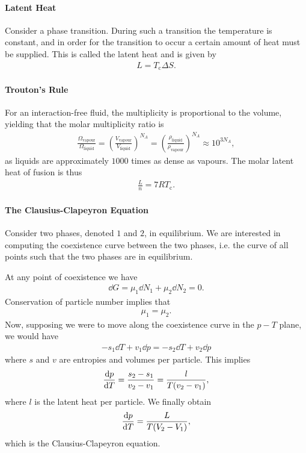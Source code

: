 \paragraph{Latent Heat}
Consider a phase transition. During such a transition the temperature is constant, and in order for the transition to occur a certain amount of heat must be supplied. This is called the latent heat and is given by
\begin{align*}
	L = T_{\text{c}}\Delta S.
\end{align*}

\paragraph{Trouton's Rule}
For an interaction-free fluid, the multiplicity is proportional to the volume, yielding that the molar multiplicity ratio is
\begin{align*}
	\frac{\Omega_{\text{vapour}}}{\Omega_{\text{liquid}}} = \left(\frac{V_{\text{vapour}}}{V_{\text{liquid}}}\right)^{N_{A}} = \left(\frac{\rho_{\text{liquid}}}{\rho_{\text{vapour}}}\right)^{N_{A}} \approx 10^{3N_{A}},
\end{align*}
as liquids are approximately $1000$ times as dense as vapours. The molar latent heat of fusion is thus
\begin{align*}
	\frac{L}{n} = 7RT_{\text{c}}.
\end{align*}

\paragraph{The Clausius-Clapeyron Equation}
Consider two phases, denoted $1$ and $2$, in equilibrium. We are interested in computing the coexistence curve between the two phases, i.e. the curve of all points such that the two phases are in equilibrium.

At any point of coexistence we have
\begin{align*}
	\dd{G} = \mu_{1}\dd{N_{1}} + \mu_{2}\dd{N_{2}} = 0.
\end{align*}
Conservation of particle number implies that
\begin{align*}
	\mu_{1} = \mu_{2}.
\end{align*}
Now, supposing we were to move along the coexistence curve in the $p-T$ plane, we would have
\begin{align*}
	-s_{1}\dd{T} + v_{1}\dd{p} = -s_{2}\dd{T} + v_{2}\dd{p}
\end{align*}
where $s$ and $v$ are entropies and volumes per particle. This implies
\begin{align*}
	\dv{p}{T} = \frac{s_{2} - s_{1}}{v_{2} - v_{1}} = \frac{l}{T(v_{2} - v_{1})},
\end{align*}
where $l$ is the latent heat per particle. We finally obtain
\begin{align*}
	\dv{p}{T} = \frac{L}{T(V_{2} - V_{1})},
\end{align*}
which is the Clausius-Clapeyron equation.